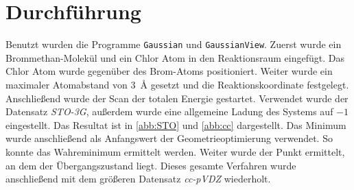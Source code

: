 \section{Durchführung}
Benutzt wurden die Programme \texttt{Gaussian} und \texttt{GaussianView}.
Zuerst wurde ein Brommethan-Molekül und ein Chlor Atom in den Reaktionsraum eingefügt. 
Das Chlor Atom wurde gegenüber des Brom-Atoms positioniert. 
Weiter wurde ein maximaler Atomabstand von \qty{3}{\angstrom} gesetzt und die Reaktionskoordinate festgelegt.
Anschließend wurde der Scan der totalen Energie gestartet.
Verwendet wurde der Datensatz \textit{STO-3G}, außerdem wurde eine allgemeine Ladung des Systems auf $-1$ eingestellt.
Das Resultat ist in \ref{abb:STO} und \ref{abb:cc} dargestellt. 
Das Minimum wurde anschließend als Anfangswert der Geometrieoptimierung verwendet.
So konnte das Wahreminimum ermittelt werden.
Weiter wurde der Punkt ermittelt, an dem der Übergangszustand liegt.
Dieses gesamte Verfahren wurde anschließend mit dem größeren Datensatz \textit{cc-pVDZ} wiederholt.
